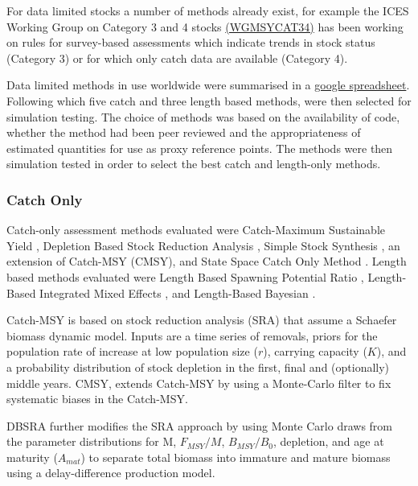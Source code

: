 For data limited stocks a number of methods already exist, for example the ICES Working Group on Category 3 and 4 stocks \href{ 
http://www.ices.dk/sites/pub/Publication Reports/Expert Group Report/acom/2017/WKMSYCAT34/01 WKMSYCAT34 REPORT 2017.pdf}{(WGMSYCAT34)} has been working on rules for survey-based assessments which indicate trends in stock status (Category 3) or for which only catch data are available (Category 4). 

Data limited methods in use worldwide were summarised in a \href{https://docs.google.com/spreadsheets/d/17_qQdzDY41ZrL0yT6QtHpUR4_ydxx_xfCh4GiDqYymU/edit?usp=sharing}{google spreadsheet}. Following which five catch and three length based methods, were then selected for simulation testing. The choice of methods was based on the availability of code, whether the method had been peer reviewed and the appropriateness of estimated quantities for use as proxy reference points. The methods were then simulation tested \citep{pons2019catchlen} in order to select the best catch and length-only methods.


\subsubsection*{Catch Only}

Catch-only assessment methods evaluated were Catch-Maximum Sustainable Yield \citep[Catch-MSY][]{martell2013simple}, Depletion Based  Stock Reduction Analysis \citep[DBSRA][]{dick2011depletion}, Simple Stock Synthesis \citep[SSS][]{cope2013implementing}, an extension of Catch-MSY (CMSY), and State Space Catch Only Method \citep[SSCOM][]{thorson2015catch}. Length based methods evaluated were Length Based Spawning Potential Ratio \citep[LBSPR][]{hordyk2014novel,hordyk2015evaluation}, Length-Based Integrated Mixed Effects \citep[LIME][]{rudd2017accounting}, and Length-Based Bayesian \citep[LBB][]{froese2018new}.

Catch-MSY  is based on stock reduction analysis (SRA) that assume a Schaefer biomass dynamic model. Inputs are a time series of removals, priors for the population rate of increase at low population size ($r$), carrying capacity ($K$), and a probability distribution of stock depletion in the first, final and (optionally) middle years. CMSY, extends Catch-MSY by using a Monte-Carlo filter to fix systematic biases in the Catch-MSY. 

DBSRA further modifies the SRA approach by using Monte Carlo draws from the parameter distributions for M, $F_{MSY}/M$, $B_{MSY}/B_0$, depletion, and age at maturity ($A_{mat}$) to separate total biomass into immature and mature biomass using a delay-difference production model. 

